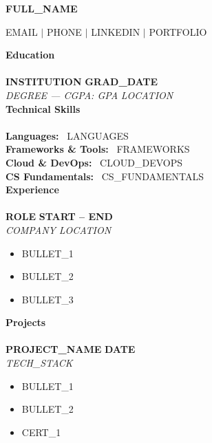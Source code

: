 \documentclass[11pt,letterpaper]{article}
\newcommand{\rname}[1]{{\centering\Huge\bfseries #1\par}}
\newcommand{\rcontact}[1]{{\centering\small #1\par}}
\newcommand{\ressection}[1]{%
  \vspace{10pt}
  {\bfseries\large #1}\\[1pt]
  \noindent{\color{accent}\rule{0.16\linewidth}{1.4pt}}\\[4pt]
}
\newcommand{\resheading}[4]{%
  \noindent\textbf{#1} \hfill \textbf{#2}\\[1pt]
  \noindent\textit{#3} \hfill \textit{#4}\\[2pt]
}
\newenvironment{resitems}{%
  \begin{itemize}[leftmargin=16pt,itemsep=1pt,topsep=2pt,parsep=0pt,label=\textbullet]
}{%
  \end{itemize}
}
\newcommand{\resitem}[1]{\item #1}
\newcommand{\skillrow}[2]{\textbf{#1:}~#2\\[2pt]}
\begin{document}
\rname{ {{FULL_NAME}} }
\rcontact{ {{EMAIL}} $\vert$ {{PHONE}} $\vert$ {{LINKEDIN}} $\vert$ {{PORTFOLIO}} }

\ressection{Education}
\resheading{ {{INSTITUTION}} }{ {{GRAD_DATE}} }{ {{DEGREE}} --- CGPA: {{GPA}} }{ {{LOCATION}} }

\ressection{Technical Skills}
\skillrow{Languages}{ {{LANGUAGES}} }
\skillrow{Frameworks \& Tools}{ {{FRAMEWORKS}} }
\skillrow{Cloud \& DevOps}{ {{CLOUD_DEVOPS}} }
\skillrow{CS Fundamentals}{ {{CS_FUNDAMENTALS}} }

\ressection{Experience}
\resheading{ {{ROLE}} }{ {{START}} -- {{END}} }{ {{COMPANY}} }{ {{LOCATION}} }
\begin{resitems}
\resitem{ {{BULLET_1}} }
\resitem{ {{BULLET_2}} }
\resitem{ {{BULLET_3}} }
\end{resitems}

\ressection{Projects}
\resheading{ {{PROJECT_NAME}} }{ {{DATE}} }{ {{TECH_STACK}} }{ }
\begin{resitems}
\resitem{ {{BULLET_1}} }
\resitem{ {{BULLET_2}} }
\end{resitems}

\begin{resitems}
\resitem{ {{CERT_1}} }
\end{resitems}
\end{document}
